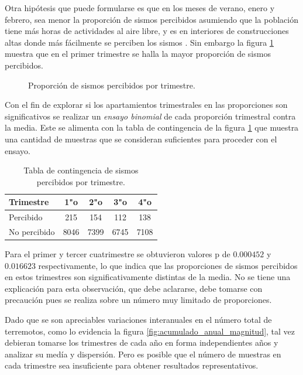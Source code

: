 \documentclass[a4paper]{report}
\begin{document}
Otra hipótesis que puede formularse es que en los meses de verano, enero y febrero, sea menor la proporción de sismos percibidos asumiendo que la población tiene más horas de actividades al aire libre, y es en interiores de construcciones altas donde más fácilmente se perciben los sismos \cite{noauthor_intensidad_2022}.
Sin embargo la figura \ref{fig:percibidos_trimestre_histrograma} muestra que en el primer trimestre se halla la mayor proporción de sismos percibidos.

\begin{figure}[!ht]
	\centering
	
	\vspace{-0.8cm}
	\caption{Proporción de sismos percibidos por trimestre.}
	\label{fig:percibidos_trimestre_histrograma}
\end{figure}

Con el fin de explorar si los apartamientos trimestrales en las proporciones son significativos se realizar un \emph{ensayo binomial} de cada proporción trimestral contra la media.
Este se alimenta con la tabla de contingencia de la figura \ref{fig:tabla_contingencia_trimestre} que muestra una cantidad de muestras que se consideran suficientes para proceder con el ensayo.

\begin{table}[!ht]
	\centering
	\begin{tabular}{lcccc}
		\toprule
		Trimestre & 1"o & 2"o & 3"o & 4"o \\
		\midrule
		Percibido & \num{215} & \num{154} & \num{112} & \num{138} \\
		No percibido & \num{8046} & \num{7399} & \num{6745} & \num{7108} \\
		\bottomrule
	\end{tabular}
	\caption{Tabla de contingencia de sismos percibidos por trimestre.}
	\label{fig:tabla_contingencia_trimestre}
\end{table}

Para el primer y tercer cuatrimestre se obtuvieron valores p de \(0.000452\) y \(0.016623\) respectivamente, lo que indica que las proporciones de sismos percibidos en estos trimestres son significativamente distintas de la media.
No se tiene una explicación para esta observación, que debe aclararse, debe tomarse con precaución pues se realiza sobre un número muy limitado de proporciones.

Dado que se son apreciables variaciones interanuales en el número total de terremotos, como lo evidencia la figura \ref{fig:acumulado_anual_magnitud}, tal vez debieran tomarse los trimestres de cada año en forma independientes años y analizar su medía y dispersión.
Pero es posible que el número de muestras en cada trimestre sea insuficiente para obtener resultados representativos. 
\end{document}
